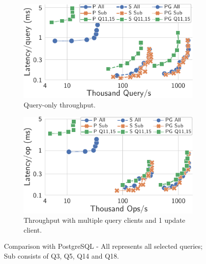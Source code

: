 \documentclass[sigplan,twocolumn,review,anonymous]{acmart}
\begin{document}
\begin{figure}
	\centering
	\begin{minipage}{.55\linewidth}
		\begin{subfigure}{.482\linewidth}
			\includegraphics[width=1\linewidth]{postgres/postgresQueryOnly}
			\caption{Query-only  throughput.}
			\label{fig:postgres_query}
			\vspace*{0.7em}
		\end{subfigure}%
		\hspace*{0.3em}
		\begin{subfigure}{.483\linewidth}
			\includegraphics[width=1\linewidth]{postgres/postgresUpdateOnlyOps}
			\caption{Throughput with multiple query clients and 1 update client.}
			\label{fig:postgres_update}
		\end{subfigure}%
		\vspace*{-0.65em}
		\caption{Comparison with PostgreSQL - All represents all selected queries; Sub consists of Q3, Q5, Q14 and Q18.}

\end{minipage}
\end{figure}
\end{document}
